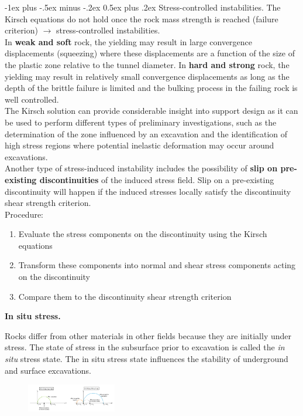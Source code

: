\documentclass[10pt,landscape,a4paper]{article}
\makeatletter
\newcounter{Chapcounter}
\newcommand{\chapter}[1]{{\addtocounter{Chapcounter}{1}\fontsize{17}{16}\textbf{#1}}}
\renewcommand{\section}{\@startsection{section}{1}{0mm}%
	{-1ex plus -.5ex minus -.2ex}%
	{0.5ex plus .2ex}%
	{\normalfont\large\bfseries}}
\makeatother
\begin{document}
\begin{multicols}{3}
	\section{Stress-controlled instabilities.}
	The Kirsch equations do not hold once the rock mass strength is reached (failure criterion) $\to$ stress-controlled instabilities.\\
	In \textbf{weak and soft} rock, the yielding may result in large convergence displacements (squeezing) where these displacements are a function of the size of the plastic zone relative to the tunnel diameter.
	In \textbf{hard and strong} rock, the yielding may result in relatively small convergence displacements as long as the depth of the brittle failure is limited and the bulking process in the failing rock is well controlled.\\
	The Kirsch solution can provide considerable insight into support design as it can be used to perform different types of preliminary investigations, such as  the determination of the zone influenced by an excavation and the identification of high stress regions where potential inelastic deformation may occur around excavations.\\
	Another type of stress-induced instability includes the possibility of \textbf{slip on pre-existing discontinuities} of the induced stress field.
	Slip on a pre-existing discontinuity will happen if the induced stresses locally satisfy the discontinuity shear strength criterion.\\
	Procedure:
	\begin{enumerate}
		\item Evaluate the stress components on the discontinuity using the Kirsch equations
		\item Transform these components into normal and shear stress components acting on the discontinuity
		\item Compare them to the discontinuity shear strength criterion
	\end{enumerate}
	
	\chapter{In situ stress.}
	
	Rocks differ from other materials in other fields because they are initially under stress.
	The state of stress in the subsurface prior to excavation is called the \textit{in situ} stress state.
	The in situ stress state influences the stability of underground and surface excavations.
	\begin{figure}[H]
		\centering
		\includegraphics[width=0.35\textwidth]{in-situ}
	\end{figure}
	

\end{multicols}
\end{document}
